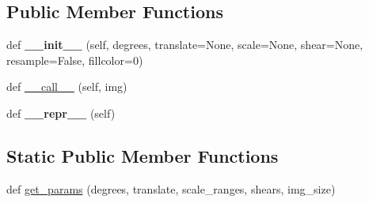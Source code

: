 \subsection*{Public Member Functions}
\begin{DoxyCompactItemize}
\item 
\mbox{\label{classtorchvision_1_1transforms_1_1transforms_1_1RandomAffine_a9cf9b3d839bc8015b6f2c270ce5fc668}} 
def {\bfseries \+\_\+\+\_\+init\+\_\+\+\_\+} (self, degrees, translate=None, scale=None, shear=None, resample=False, fillcolor=0)
\item 
def \hyperlink{classtorchvision_1_1transforms_1_1transforms_1_1RandomAffine_a411a09e799bed93bc83213b41c87cdd4}{\+\_\+\+\_\+call\+\_\+\+\_\+} (self, img)
\item 
\mbox{\label{classtorchvision_1_1transforms_1_1transforms_1_1RandomAffine_a9b24fb4815056105ff477415e1ef53a8}} 
def {\bfseries \+\_\+\+\_\+repr\+\_\+\+\_\+} (self)
\end{DoxyCompactItemize}
\subsection*{Static Public Member Functions}
\begin{DoxyCompactItemize}
\item 
def \hyperlink{classtorchvision_1_1transforms_1_1transforms_1_1RandomAffine_a3605d8f67e6ccd9d79086acb064992aa}{get\+\_\+params} (degrees, translate, scale\+\_\+ranges, shears, img\+\_\+size)
\end{DoxyCompactItemize}
